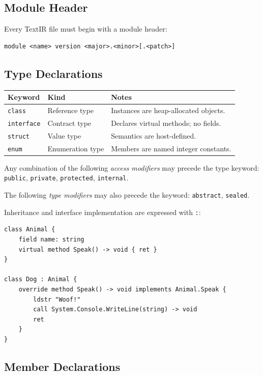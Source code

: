 \documentclass[11pt,a4paper]{article}
\newcommand{\term}[1]{\texttt{#1}}
\begin{document}
\subsection{Module Header}

Every TextIR file must begin with a module header:

\begin{lstlisting}[style=textir]
module <name> version <major>.<minor>[.<patch>]
\end{lstlisting}

\subsection{Type Declarations}

\begin{center}
\begin{tabular}{lll}
  \toprule
  \textbf{Keyword}   & \textbf{Kind}      & \textbf{Notes} \\
  \midrule
  \term{class}     & Reference type   & Instances are heap-allocated objects. \\
  \term{interface} & Contract type    & Declares virtual methods; no fields. \\
  \term{struct}    & Value type       & Semantics are host-defined. \\
  \term{enum}      & Enumeration type & Members are named integer constants. \\
  \bottomrule
\end{tabular}
\end{center}

Any combination of the following \emph{access modifiers} may precede the
type keyword: \term{public}, \term{private}, \term{protected},
\term{internal}.

The following \emph{type modifiers} may also precede the keyword:
\term{abstract}, \term{sealed}.

Inheritance and interface implementation are expressed with \term{:}:

\begin{lstlisting}[style=textir]
class Animal {
    field name: string
    virtual method Speak() -> void { ret }
}

class Dog : Animal {
    override method Speak() -> void implements Animal.Speak {
        ldstr "Woof!"
        call System.Console.WriteLine(string) -> void
        ret
    }
}
\end{lstlisting}

\subsection{Member Declarations}
\end{document}
